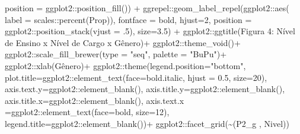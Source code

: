 \documentclass[
]{article}
\newenvironment{Shaded}{\begin{snugshade}}{\end{snugshade}}
\newcommand{\AttributeTok}[1]{\textcolor[rgb]{0.77,0.63,0.00}{#1}}
\newcommand{\DecValTok}[1]{\textcolor[rgb]{0.00,0.00,0.81}{#1}}
\newcommand{\FloatTok}[1]{\textcolor[rgb]{0.00,0.00,0.81}{#1}}
\newcommand{\FunctionTok}[1]{\textcolor[rgb]{0.00,0.00,0.00}{#1}}
\newcommand{\NormalTok}[1]{#1}
\newcommand{\SpecialCharTok}[1]{\textcolor[rgb]{0.00,0.00,0.00}{#1}}
\newcommand{\StringTok}[1]{\textcolor[rgb]{0.31,0.60,0.02}{#1}}
\begin{document}
\begin{Shaded}
\begin{Highlighting}[]
                     \AttributeTok{position =}\NormalTok{ ggplot2}\SpecialCharTok{::}\FunctionTok{position\_fill}\NormalTok{()) }\SpecialCharTok{+}
\NormalTok{  ggrepel}\SpecialCharTok{::}\FunctionTok{geom\_label\_repel}\NormalTok{(ggplot2}\SpecialCharTok{::}\FunctionTok{aes}\NormalTok{(}
    \AttributeTok{label =}\NormalTok{ scales}\SpecialCharTok{::}\FunctionTok{percent}\NormalTok{(Prop)),}
    \AttributeTok{fontface =} \StringTok{\textquotesingle{}bold\textquotesingle{}}\NormalTok{,}
    \AttributeTok{hjust=}\DecValTok{2}\NormalTok{,}
    \AttributeTok{position =}\NormalTok{ ggplot2}\SpecialCharTok{::}\FunctionTok{position\_stack}\NormalTok{(}\AttributeTok{vjust =}\NormalTok{ .}\DecValTok{5}\NormalTok{),}
    \AttributeTok{size=}\FloatTok{3.5}\NormalTok{) }\SpecialCharTok{+}
\NormalTok{  ggplot2}\SpecialCharTok{::}\FunctionTok{ggtitle}\NormalTok{(}\StringTok{\textquotesingle{}Figura 4: Nível de Ensino x Nível de Cargo x Gênero\textquotesingle{}}\NormalTok{)}\SpecialCharTok{+}
\NormalTok{  ggplot2}\SpecialCharTok{::}\FunctionTok{theme\_void}\NormalTok{()}\SpecialCharTok{+}
\NormalTok{  ggplot2}\SpecialCharTok{::}\FunctionTok{scale\_fill\_brewer}\NormalTok{(}\AttributeTok{type =} \StringTok{"seq"}\NormalTok{, }\AttributeTok{palette =} \StringTok{"BuPu"}\NormalTok{)}\SpecialCharTok{+}
\NormalTok{  ggplot2}\SpecialCharTok{::}\FunctionTok{xlab}\NormalTok{(}\StringTok{\textquotesingle{}Gênero\textquotesingle{}}\NormalTok{)}\SpecialCharTok{+}
\NormalTok{  ggplot2}\SpecialCharTok{::}\FunctionTok{theme}\NormalTok{(}\AttributeTok{legend.position=}\StringTok{"bottom"}\NormalTok{,}
                 \AttributeTok{plot.title=}\NormalTok{ggplot2}\SpecialCharTok{::}\FunctionTok{element\_text}\NormalTok{(}\AttributeTok{face=}\StringTok{\textquotesingle{}bold.italic\textquotesingle{}}\NormalTok{,}
                                                  \AttributeTok{hjust =} \FloatTok{0.5}\NormalTok{, }\AttributeTok{size=}\DecValTok{20}\NormalTok{),}
                 \AttributeTok{axis.text.y=}\NormalTok{ggplot2}\SpecialCharTok{::}\FunctionTok{element\_blank}\NormalTok{(),}
                 \AttributeTok{axis.title.y=}\NormalTok{ggplot2}\SpecialCharTok{::}\FunctionTok{element\_blank}\NormalTok{(),}
                 \AttributeTok{axis.title.x=}\NormalTok{ggplot2}\SpecialCharTok{::}\FunctionTok{element\_blank}\NormalTok{(),}
                 \AttributeTok{axis.text.x =}\NormalTok{ggplot2}\SpecialCharTok{::}\FunctionTok{element\_text}\NormalTok{(}\AttributeTok{face=}\StringTok{\textquotesingle{}bold\textquotesingle{}}\NormalTok{, }\AttributeTok{size=}\DecValTok{12}\NormalTok{),}
                 \AttributeTok{legend.title=}\NormalTok{ggplot2}\SpecialCharTok{::}\FunctionTok{element\_blank}\NormalTok{())}\SpecialCharTok{+}
\NormalTok{  ggplot2}\SpecialCharTok{::}\FunctionTok{facet\_grid}\NormalTok{(}\SpecialCharTok{\textasciitilde{}}\StringTok{\textasciigrave{}}\AttributeTok{(\textquotesingle{}P2\_g \textquotesingle{}, \textquotesingle{}Nivel\textquotesingle{})}\StringTok{\textasciigrave{}}\NormalTok{)}
\end{Highlighting}
\end{Shaded}
\end{document}
